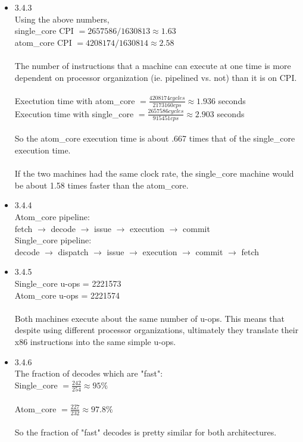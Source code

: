 \documentclass[a4paper]{article}
\begin{document}
\begin{itemize}
\item{3.4.3} \\
Using the above numbers, \\
single\_core CPI $= 2657586/1630813 \approx 1.63$ \\
atom\_core CPI $= 4208174/1630814 \approx 2.58$ \\
\\
The number of instructions that a machine can execute at one time is more dependent on processor organization (ie. pipelined vs. not) than it is on CPI. \\
\\
Exectution time with atom\_core $= \frac{4208174cycles}{2173160cps} \approx 1.936$ seconds\\
Execution time with single\_core $= \frac{2657586cycles} {915451cps} \approx 2.903$ seconds \\
\\
So the atom\_core execution time is about .667 times that of the single\_core execution time. \\ 
\\
If the two machines had the same clock rate, the single\_core machine would be about 1.58 times faster than the atom\_core.
\\

\item{3.4.4} \\
Atom\_core pipeline: \\
fetch $\rightarrow$ decode $\rightarrow$ issue $\rightarrow$ execution $\rightarrow$ commit \\
Single\_core pipeline: \\
decode $\rightarrow$ dispatch $\rightarrow$ issue $\rightarrow$ execution $\rightarrow$ commit $\rightarrow$ fetch \\


\item{3.4.5} \\
Single\_core u-ops = 2221573 \\
Atom\_core u-ops = 2221574 \\
\\
Both machines execute about the same number of u-ops. This means that despite using different processor organizations, ultimately they translate their x86 instructions into the same simple u-ops.
\\

\item{3.4.6} \\
The fraction of decodes which are "fast": \\
Single\_core $= \frac{242}{254} \approx 95\%$ \\
\\
Atom\_core $= \frac{227}{232} \approx 97.8\%$\\
\\
So the fraction of "fast" decodes is pretty similar for both architectures.
\\


\end{itemize}
\end{document}
